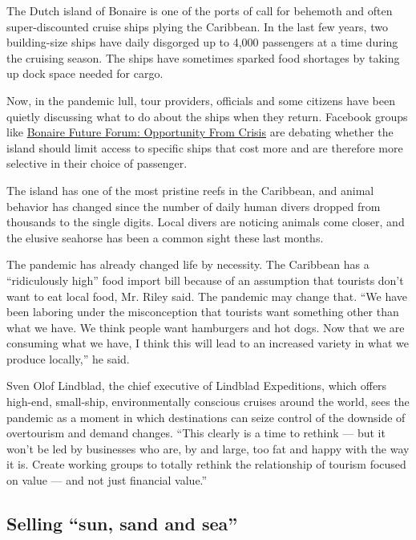The Dutch island of Bonaire is one of the ports of call for behemoth and
often super-discounted cruise ships plying the Caribbean. In the last
few years, two building-size ships have daily disgorged up to 4,000
passengers at a time during the cruising season. The ships have
sometimes sparked food shortages by taking up dock space needed for
cargo.

Now, in the pandemic lull, tour providers, officials and some citizens
have been quietly discussing what to do about the ships when they
return. Facebook groups like
\href{https://www.facebook.com/groups/BonaireFutureForum/}{Bonaire
Future Forum: Opportunity From Crisis} are debating whether the island
should limit access to specific ships that cost more and are therefore
more selective in their choice of passenger.

The island has one of the most pristine reefs in the Caribbean, and
animal behavior has changed since the number of daily human divers
dropped from thousands to the single digits. Local divers are noticing
animals come closer, and the elusive seahorse has been a common sight
these last months.

The pandemic has already changed life by necessity. The Caribbean has a
``ridiculously high'' food import bill because of an assumption that
tourists don't want to eat local food, Mr. Riley said. The pandemic may
change that. ``We have been laboring under the misconception that
tourists want something other than what we have. We think people want
hamburgers and hot dogs. Now that we are consuming what we have, I think
this will lead to an increased variety in what we produce locally,'' he
said.

Sven Olof Lindblad, the chief executive of Lindblad Expeditions, which
offers high-end, small-ship, environmentally conscious cruises around
the world, sees the pandemic as a moment in which destinations can seize
control of the downside of overtourism and demand changes. ``This
clearly is a time to rethink --- but it won't be led by businesses who
are, by and large, too fat and happy with the way it is. Create working
groups to totally rethink the relationship of tourism focused on value
--- and not just financial value.''

\hypertarget{selling-sun-sand-and-sea}{%
\subsection{Selling ``sun, sand and
sea''}\label{selling-sun-sand-and-sea}}

